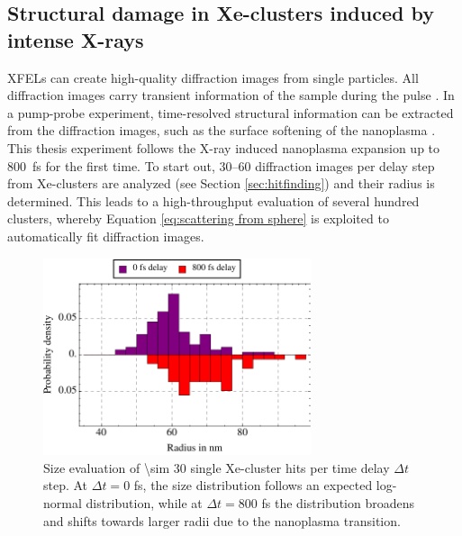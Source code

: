 \subsection{Structural damage in Xe-clusters induced by intense X-rays}\label{sec:xenon-data}
XFELs can create high-quality diffraction images from single particles. All diffraction images carry transient information of the sample during the pulse \cite{Bostedt-2012-PRL}. In a pump-probe experiment, time-resolved structural information can be extracted from the diffraction images, such as the surface softening of the nanoplasma \cite{Gorkhover-2016-NatPho}. This thesis experiment follows the X-ray induced nanoplasma expansion up to \SI{800}{\femto\second} for the first time.
To start out, \numrange{30}{60} diffraction images per delay step from Xe-clusters are analyzed (see Section \ref{sec:hitfinding}) and their radius is determined. This leads to a high-throughput evaluation of several hundred clusters, whereby Equation \eqref{eq:scattering from sphere} is exploited to automatically fit diffraction images.\\[1\baselineskip]
\begin{figure}
	\centering
		\includegraphics[width=0.70\textwidth]{images/results/size-distributions.pdf}
	\caption[Single Xe-cluster size distribution at varying time delay $\Delta t$.]{Size evaluation of \num{\sim 30} single Xe-cluster hits per time delay $\Delta t$ step. At $\Delta t=0$ fs, the size distribution follows an expected log-normal distribution, while at $\Delta t=800$ fs the distribution broadens and shifts towards larger radii due to the nanoplasma transition.}
	\label{fig:size-distributions}
\end{figure}
